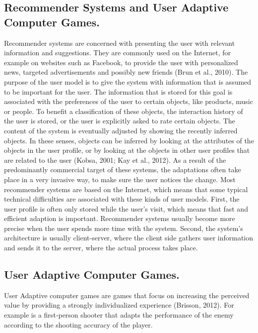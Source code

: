 \subsection{Recommender Systems and User Adaptive Computer Games.}

Recommender systems are concerned with presenting the user with relevant
information and suggestions. They are commonly used on the Internet, for example
on websites such as Facebook, to provide the user with personalized news,
targeted advertisements and possibly new friends (Brun et al.,  2010). The
purpose of the user model is to give the system with information that is assumed
to be important for the user. The information that is stored for this goal is
associated with the preferences of the user to certain objects, like products,
music or people. To benefit a classification of these objects, the interaction
history of the user is stored, or the user is explicitly asked to rate certain
objects. The content of the system is eventually adjusted by showing the
recently inferred objects. In these senses, objects can be inferred by looking
at the attributes of the objects in the user profile, or by looking at the
objects in other user profiles that are related to the user (Kobsa, 2001; Kay et
al., 2012).  As a result of the predominantly commercial target of these
systems, the adaptations often take place in a very invasive way, to make sure
the user notices the change. Most recommender systems are based on the Internet,
which means that some typical technical difficulties  are associated with these
kinds of user models. First, the user profile is often only stored while the
user’s visit,  which means that fast and efficient adaption is important.
Recommender systems usually become more precise  when the user spends more time
with the system. Second, the system’s architecture is usually client-server,
where the client side gathers user information and sends it to the server, where
the  actual process takes place.

\subsection{User Adaptive Computer Games.}  

User Adaptive computer games are games that focus on increasing the perceived
value by providing a strongly individualized experience (Brisson, 2012).  For
example is a first‐person shooter that adapts the performance of the enemy
according to the shooting accuracy of the player.

